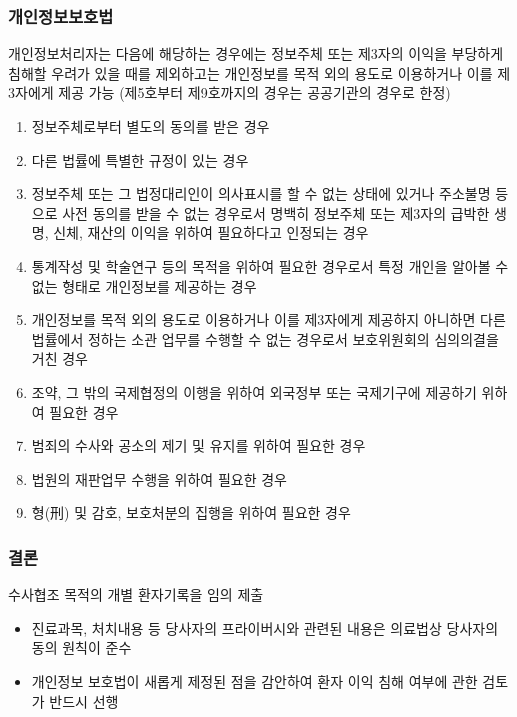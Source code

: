 \subsubsection*{개인정보보호법}
개인정보처리자는 다음에 해당하는 경우에는 정보주체 또는 제3자의 이익을 부당하게 침해할 우려가 있을 때를 제외하고는 개인정보를 목적 외의 용도로 이용하거나 이를 제3자에게 제공 가능 (제5호부터 제9호까지의 경우는 공공기관의 경우로 한정)
\begin{enumerate}\tightlist
\item 정보주체로부터 별도의 동의를 받은 경우
\item  다른 법률에 특별한 규정이 있는 경우
\item 정보주체 또는 그 법정대리인이 의사표시를 할 수 없는 상태에 있거나 주소불명 등으로 사전 동의를 받을 수 없는 경우로서 명백히 정보주체 또는 제3자의 급박한 생명, 신체, 재산의 이익을 위하여 필요하다고 인정되는 경우
\item 통계작성 및 학술연구 등의 목적을 위하여 필요한 경우로서 특정 개인을 알아볼 수 없는 형태로 개인정보를 제공하는 경우
\item 개인정보를 목적 외의 용도로 이용하거나 이를 제3자에게 제공하지 아니하면 다른 법률에서 정하는 소관 업무를 수행할 수 없는 경우로서 보호위원회의 심의\cntrdot{}의결을 거친 경우
\item 조약, 그 밖의 국제협정의 이행을 위하여 외국정부 또는 국제기구에 제공하기 위하여 필요한 경우
\item 범죄의 수사와 공소의 제기 및 유지를 위하여 필요한 경우
\item 법원의 재판업무 수행을 위하여 필요한 경우
\item 형(刑) 및 감호, 보호처분의 집행을 위하여 필요한 경우
\end{enumerate}
\subsubsection*{결론}
수사협조 목적의 개별 환자기록을 임의 제출
\begin{mdframed}[linecolor=blue,middlelinewidth=2]
\begin{itemize}\tightlist
\item 진료과목, 처치내용 등 당사자의 프라이버시와 관련된 내용은 의료법상  당사자의 동의 원칙이 준수 
\item 개인정보 보호법이 새롭게 제정된 점을 감안하여 환자 이익 침해 여부에 관한 검토가 반드시 선행
\end{itemize}
\end{mdframed}
